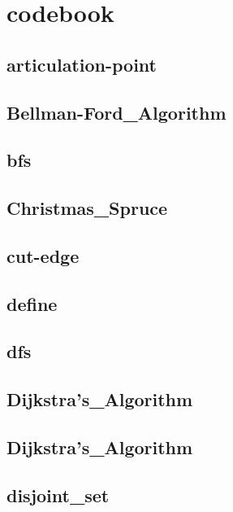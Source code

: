 
\section{codebook}
    \subsection{articulation-point}
        
    \subsection{Bellman-Ford_Algorithm}
        
    \subsection{bfs}
        
    \subsection{Christmas_Spruce}
        
    \subsection{cut-edge}
        
    \subsection{define}
        
    \subsection{dfs}
        
    \subsection{Dijkstra's_Algorithm}
        
    \subsection{Dijkstra's_Algorithm}
        
    \subsection{disjoint_set}
        

